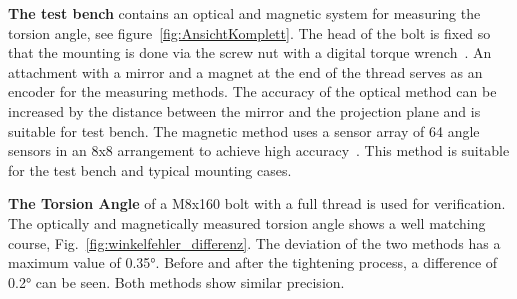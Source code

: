 \begin{multicols}{2}
\begin{mdboxshad}
				{\textbf{The test bench} contains an optical and magnetic system for measuring the torsion angle, see figure~\ref{fig:AnsichtKomplett}. The head of the bolt is fixed so that the mounting is done via the screw nut with a digital torque wrench~\cite{SCS_torque}. An attachment with a mirror and a magnet at the end of the thread serves as an encoder for the measuring methods. The accuracy of the optical method can be increased by the distance between the mirror and the projection plane and is suitable for test bench. The magnetic method uses a sensor array of 64 angle sensors in an 8x8 arrangement to achieve high accuracy~\cite{stud_mehm}. This method is suitable for the test bench and typical mounting cases. 
				}
				
				\vspace*{5mm}
				\begin{figurehere} 
				\end{figurehere} 
			\end{mdboxshad} 
\vspace{10mm}
			\begin{mdboxshad}
				\textbf{The Torsion Angle} of a M8x160 bolt with a full thread is used for verification. 
				The optically and magnetically measured torsion angle shows a well matching course, Fig.~\ref{fig:winkelfehler_differenz}. The deviation of the two methods has a maximum value of {0.35}\si{\degree}. Before and after the tightening process, a difference of {0.2}\si{\degree} can be seen. Both methods show similar precision.
				

\end{mdboxshad}
\end{multicols}
